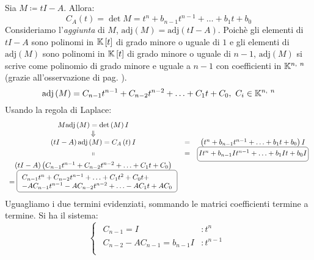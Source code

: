 \begin{demonstration}
	Sia $M\coloneqq tI-A$. Allora:
	\begin{equation*}
		C_A\left(t\right)=\det M=t^n+b_{n-1}t^{n-1}+\ldots+b_1t+b_0
	\end{equation*}
Consideriamo l'\textit{aggiunta} di $M$, $\mathrm{adj}\left(M\right)=\mathrm{adj}\left(tI-A\right)$.
Poichè gli elementi di $tI-A$ sono polinomi in $\mathbb{K}\left[t\right]$ di grado minore o uguale di $1$ e gli elementi di $\mathrm{adj}\left(M\right)$ sono polinomi in $\mathbb{K}\left[t\right]$ di grado minore o uguale di $n-1$, $\mathrm{adj}\left(M\right)$ si scrive come polinomio di grado minore e uguale a $n-1$ con coefficienti in $\mathbb{K}^{n,\ n}$ (grazie all'osservazione di pag. \pageref{polinomicoeffmatrisci}).
\begin{equation*}
	\mathrm{adj}\left(M\right)=C_{n-1}t^{n-1}+C_{n-2}t^{n-2}+\ldots+C_1t+C_0,\ C_i\in\kamp^{n,\ n}
\end{equation*}
Usando la regola di Laplace:
\begin{equation*}
	\begin{array}{ccc}
		M\mathrm{adj}\left(M\right)=\det\left(M\right)I&&\\
		\Downarrow&&\\
		\left(tI-A\right)\mathrm{adj}\left(M\right)=C_A\left(t\right)I&=&\left(t^n+b_{n-1}t^{n-1}+\ldots+b_1t+b_0\right)I\\
		\shortparallel &=& \ovaled{It^n+b_{n-1}It^{n-1}+\ldots+b_1It+b_0I}\\
		\left(tI-A\right)\left(C_{n-1}t^{n-1}+C_{n-2}t^{n-2}+\ldots+C_1t+C_0\right)&&\\
		={\tikz[baseline=(char.base)]\node[anchor=south west, draw,rectangle, rounded corners, inner sep=2pt, minimum size=7mm,
		text height=6mm](char){$\begin{array}{l}
				{\small C_{n-1}t^n+C_{n-2}t^{n-1}+\ldots+C_1t^2+C_0t+}\\
				{\small-AC_{n-1}t^{n-1}-AC_{n-2}t^{n-2}+\ldots-AC_1t+AC_0}
			\end{array}$} ;}&&
	\end{array}
\end{equation*}
Uguagliamo i due termini evidenziati, sommando le matrici coefficienti termine a termine. Si ha il sistema:
\begin{equation*}
	\begin{cases}
		\begin{array}{ll}
			C_{n-1}=I&\colon t^n\\
			C_{n-2}-AC_{n-1}=b_{n-1}I&\colon t^{n-1}\\

\end{array}
\end{cases}
\end{equation*}
\end{demonstration}
